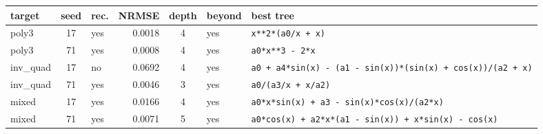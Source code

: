 \begin{tabular}{lclrcll}
\hline
target & seed & rec. & NRMSE & depth & beyond & best tree \\
\hline
poly3 & 17 & yes & 0.0018 & 4 & yes & \texttt{x**2*(a0/x + x)} \\
poly3 & 71 & yes & 0.0008 & 4 & yes & \texttt{a0*x**3 - 2*x} \\
inv\_quad & 17 & no & 0.0692 & 4 & yes & \texttt{a0 + a4*sin(x) - (a1 - sin(x))*(sin(x) + cos(x))/(a2 + x)} \\
inv\_quad & 71 & yes & 0.0046 & 3 & yes & \texttt{a0/(a3/x + x/a2)} \\
mixed & 17 & yes & 0.0166 & 4 & yes & \texttt{a0*x*sin(x) + a3 - sin(x)*cos(x)/(a2*x)} \\
mixed & 71 & yes & 0.0071 & 5 & yes & \texttt{a0*cos(x) + a2*x*(a1 - sin(x)) + x*sin(x) - cos(x)} \\
\hline
\end{tabular}
